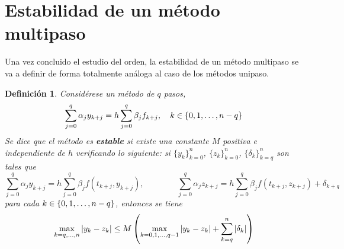 \documentclass[11pt]{report}
\theoremstyle{mytheorem}
\theoremstyle{mydefinition}
\newtheorem{definition}{Definición}
\theoremstyle{myexample}
\newenvironment{cdefinition} %
  {\begin{mdframed}[
        linewidth=3pt,
        linecolor=c1,
        bottomline=false,
        topline=false,
        rightline=false,
        innerrightmargin=0pt,
        innertopmargin=0pt,
        innerbottommargin=0pt,
        innerleftmargin=1em, %
        skipabove=\baselineskip]
    \begin{definition}}
  {\end{definition}\end{mdframed}}
\newcommand{\mybf}[1]{\boldmath\textbf{\color{c1}#1}\unboldmath}
\begin{document}
\section{Estabilidad de un método multipaso}

Una vez concluido el estudio del orden, la estabilidad de un método multipaso se va a definir de forma totalmente análoga al caso de los métodos unipaso.

\begin{cdefinition}
Considérese un método de $q$ pasos,
\[\sum_{j=0}^{q} \alpha_j y_{k+j} = h\sum_{j=0}^q \beta_j f_{k+j}, \quad k \in \{0,1,\mathellipsis,n-q\}\]
Se dice que el método es \mybf{estable} si existe una constante $M$ positiva e independiente de $h$ verificando lo siguiente: si $\{y_k\}_{k=0}^n$, $\{z_k\}_{k=0}^n$, $\{\delta_k\}_{k=q}^{n}$ son tales que
\[\sum_{j=0}^q \alpha_j y_{k+j} = h\sum_{j=0}^q \beta_j f(t_{k+j},y_{k+j}), \qquad \qquad \sum_{j=0}^q \alpha_j z_{k+j} = h\sum_{j=0}^q \beta_j f(t_{k+j},z_{k+j})+\delta_{k+q}\]
para cada $k \in \{0,1,\mathellipsis,n-q\}$, entonces se tiene
\[\max_{k=q,\mathellipsis,n} |y_k-z_k| \leq M\left(\max_{k=0,1,\mathellipsis,q-1}|y_k-z_k|+\sum_{k=q}^{n} |\delta_k|\right)\]
\end{cdefinition}
\end{document}
